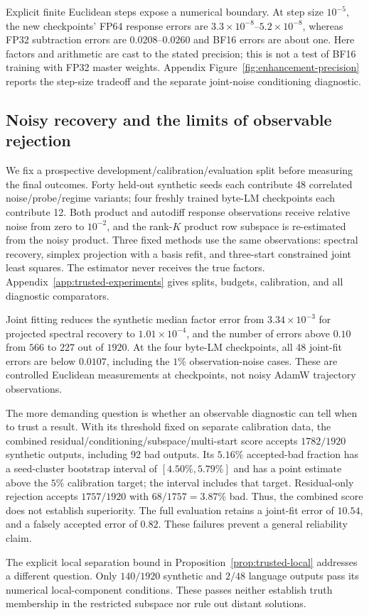 Explicit finite Euclidean steps expose a numerical boundary. At step size
$10^{-5}$, the new checkpoints' FP64 response errors are
$3.3\times10^{-8}$--$5.2\times10^{-8}$, whereas FP32 subtraction errors are
$0.0208$--$0.0260$ and BF16 errors are about one.
Here factors and arithmetic are cast to the stated precision; this is not a
test of BF16 training with FP32 master weights. Appendix
Figure~\ref{fig:enhancement-precision} reports the step-size tradeoff and the
separate joint-noise conditioning diagnostic.

\subsection{Noisy recovery and the limits of observable rejection}
\label{sec:trusted-recovery}

We fix a prospective development/calibration/evaluation split before
measuring the final outcomes. Forty held-out synthetic seeds each contribute
48 correlated noise/probe/regime variants; four freshly trained byte-LM
checkpoints each contribute 12. Both product and autodiff response
observations receive relative noise from zero to $10^{-2}$, and the rank-$K$
product row subspace is re-estimated from the noisy product.
Three fixed methods use the same observations: spectral recovery,
simplex projection with a basis refit, and three-start constrained joint
least squares. The estimator never receives the true factors.
Appendix~\ref{app:trusted-experiments} gives splits, budgets, calibration,
and all diagnostic comparators.



Joint fitting reduces the synthetic median factor error from
$3.34\times10^{-3}$ for projected spectral recovery to $1.01\times10^{-4}$,
and the number of errors above $0.10$ from $566$ to $227$ out of $1920$.
At the four byte-LM checkpoints, all 48 joint-fit errors are below $0.0107$,
including the $1\%$ observation-noise cases. These are controlled Euclidean
measurements at checkpoints, not noisy AdamW trajectory observations.

The more demanding question is whether an observable diagnostic can tell
when to trust a result. With its threshold fixed on separate calibration
data, the combined residual/conditioning/subspace/multi-start score accepts
$1782/1920$ synthetic outputs, including 92 bad outputs. Its $5.16\%$
accepted-bad fraction has a seed-cluster bootstrap interval of
$[4.50\%,5.79\%]$ and has a point estimate above the $5\%$ calibration target;
the interval includes that target.
Residual-only rejection accepts $1757/1920$ with $68/1757=3.87\%$ bad.
Thus, the combined score does not establish superiority.
The full evaluation retains a joint-fit error of $10.54$, and a falsely
accepted error of $0.82$. These failures prevent a general reliability claim.

The explicit local separation bound in
Proposition~\ref{prop:trusted-local} addresses a different question.
Only $140/1920$ synthetic and $2/48$ language outputs pass its numerical
local-component conditions. These passes neither establish truth membership
in the restricted subspace nor rule out distant solutions.

